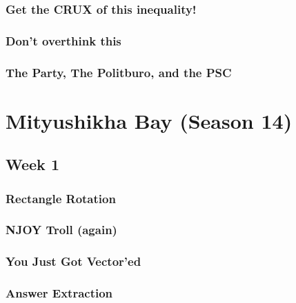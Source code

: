 \documentclass[titlepage=true]{scrartcl}
\begin{document}
    \subsubsection{Get the CRUX of this inequality!}
	\label{13-2-5}
	
	\newpage

    \subsubsection{Don't overthink this}
	\label{13-2-6}
	
	\newpage

    \subsubsection{The Party, The Politburo, and the PSC}
	\label{13-2-7}
	
	\newpage

\section{Mityushikha Bay (Season 14)}

    \subsection{Week 1}

    \subsubsection{Rectangle Rotation}
	\label{14-1-1}
	
	\newpage

	\subsubsection{NJOY Troll (again)}
	\label{14-1-2}
	
	\newpage

	\subsubsection{You Just Got Vector'ed}
	\label{14-1-3}
	
	\newpage

	\subsubsection{Answer Extraction}
	\label{14-1-4}
	
	\newpage
\end{document}
